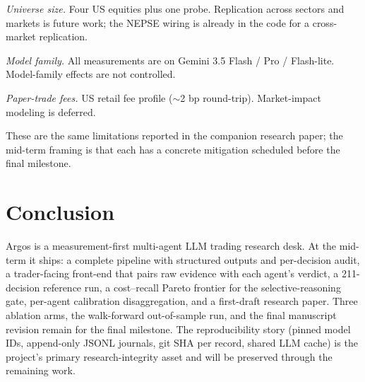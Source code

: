 \documentclass[conference]{IEEEtran}
\begin{document}
\emph{Universe size.} Four US equities plus one probe. Replication
across sectors and markets is future work; the NEPSE wiring is
already in the code for a cross-market replication.

\emph{Model family.} All measurements are on Gemini 3.5 Flash /
Pro / Flash-lite. Model-family effects are not controlled.

\emph{Paper-trade fees.} US retail fee profile ($\sim$2 bp
round-trip). Market-impact modeling is deferred.

These are the same limitations reported in the companion research
paper; the mid-term framing is that each has a concrete mitigation
scheduled before the final milestone.

\section{Conclusion}

Argos is a measurement-first multi-agent LLM trading research desk.
At the mid-term it ships: a complete pipeline with structured
outputs and per-decision audit, a trader-facing front-end that
pairs raw evidence with each agent's verdict, a 211-decision
reference run, a cost--recall Pareto frontier for the
selective-reasoning gate, per-agent calibration disaggregation,
and a first-draft research paper. Three ablation arms, the
walk-forward out-of-sample run, and the final manuscript revision
remain for the final milestone. The reproducibility story
(pinned model IDs, append-only JSONL journals, git SHA per record,
shared LLM cache) is the project's primary research-integrity
asset and will be preserved through the remaining work.
\end{document}
